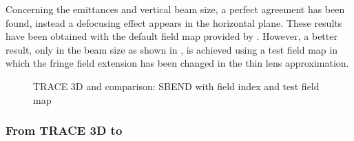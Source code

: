 \begin{itemize}
Concerning the emittances and vertical beam size, a perfect agreement has been found, instead a defocusing effect appears in the horizontal plane. These results have been obtained with the default field map provided by \opal. However, a better result, only in the beam size as shown in , is achieved using a test field map in which the fringe field extension has been changed in the thin lens approximation.

\begin{figure}[!htb]
\begin{center}
    \hspace{1.8cm}
    \caption{TRACE 3D and \opal comparison: SBEND with field index and test field map}
    \label{fig:SBEND_FI_test}
 \end{center}
 \end{figure}
\end{itemize}

\subsubsection{From TRACE 3D to \opalt}
\label{ssec:T3DtoOPAL}


